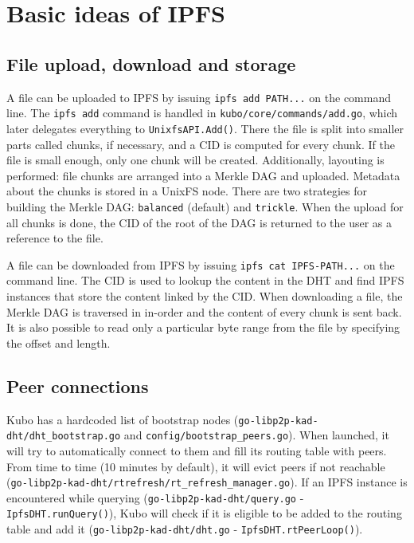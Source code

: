 




\section{Basic ideas of IPFS}

\subsection{File upload, download and storage}

A file can be uploaded to IPFS by issuing \verb|ipfs add PATH...| on the
command line. The \verb|ipfs add| command is handled in
\verb|kubo/core/commands/add.go|, which later delegates everything to
\verb|UnixfsAPI.Add()|. There the file is split into smaller parts called
chunks, if necessary, and a CID is computed for every chunk. If the file is
small enough, only one chunk will be created. Additionally, layouting is
performed: file chunks are arranged into a Merkle DAG and uploaded. Metadata
about the chunks is stored in a UnixFS node. There are two strategies for
building the Merkle DAG: \verb|balanced| (default) and \verb|trickle|. When the
upload for all chunks is done, the CID of the root of the DAG is returned to
the user as a reference to the file.

A file can be downloaded from IPFS by issuing \verb|ipfs cat IPFS-PATH...| on
the command line. The CID is used to lookup the content in the DHT and find
IPFS instances that store the content linked by the CID. When downloading a
file, the Merkle DAG is traversed in in-order and the content of every chunk is
sent back. It is also possible to read only a particular byte range from the
file by specifying the offset and length.


\subsection{Peer connections}

Kubo has a hardcoded list of bootstrap nodes
(\verb|go-libp2p-kad-dht/dht_bootstrap.go| and
\verb|config/bootstrap_peers.go|). When launched, it will try to automatically
connect to them and fill its routing table with peers. From time to time (10
minutes by default), it will evict peers if not reachable
(\verb|go-libp2p-kad-dht/rtrefresh/rt_refresh_manager.go|). If an IPFS instance
is encountered while querying (\verb|go-libp2p-kad-dht/query.go| -
\verb|IpfsDHT.runQuery()|), Kubo will check if it is eligible to be added to
the routing table and add it (\verb|go-libp2p-kad-dht/dht.go| -
\verb|IpfsDHT.rtPeerLoop()|).


